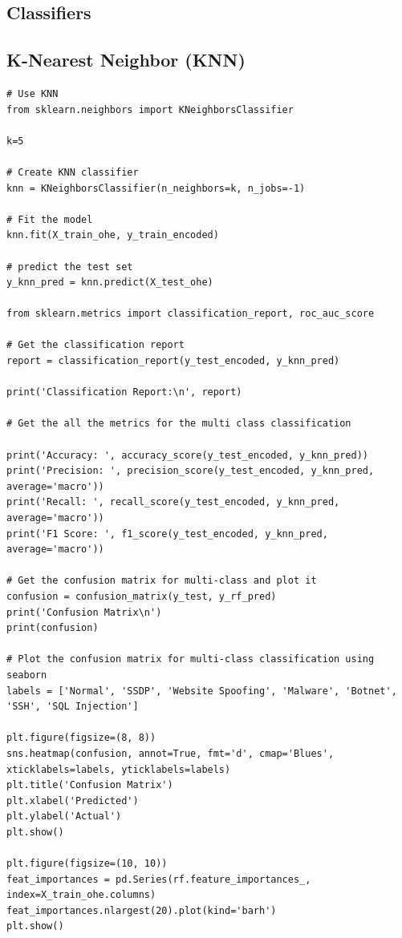\begin{appendices}
\newpage
\section{Classifiers}
\label{appx: Classifiers}

\subsection{K-Nearest Neighbor (KNN)}
\begin{lstlisting}
# Use KNN
from sklearn.neighbors import KNeighborsClassifier

k=5

# Create KNN classifier
knn = KNeighborsClassifier(n_neighbors=k, n_jobs=-1)

# Fit the model
knn.fit(X_train_ohe, y_train_encoded)

# predict the test set
y_knn_pred = knn.predict(X_test_ohe)

from sklearn.metrics import classification_report, roc_auc_score

# Get the classification report
report = classification_report(y_test_encoded, y_knn_pred)

print('Classification Report:\n', report)

# Get the all the metrics for the multi class classification

print('Accuracy: ', accuracy_score(y_test_encoded, y_knn_pred))
print('Precision: ', precision_score(y_test_encoded, y_knn_pred, average='macro'))
print('Recall: ', recall_score(y_test_encoded, y_knn_pred, average='macro'))
print('F1 Score: ', f1_score(y_test_encoded, y_knn_pred, average='macro'))

# Get the confusion matrix for multi-class and plot it
confusion = confusion_matrix(y_test, y_rf_pred)
print('Confusion Matrix\n')
print(confusion)

# Plot the confusion matrix for multi-class classification using seaborn
labels = ['Normal', 'SSDP', 'Website Spoofing', 'Malware', 'Botnet', 'SSH', 'SQL Injection']

plt.figure(figsize=(8, 8))
sns.heatmap(confusion, annot=True, fmt='d', cmap='Blues', xticklabels=labels, yticklabels=labels)
plt.title('Confusion Matrix')
plt.xlabel('Predicted')
plt.ylabel('Actual')
plt.show()

plt.figure(figsize=(10, 10))
feat_importances = pd.Series(rf.feature_importances_, index=X_train_ohe.columns)
feat_importances.nlargest(20).plot(kind='barh')
plt.show()
\end{lstlisting}


\end{appendices}
